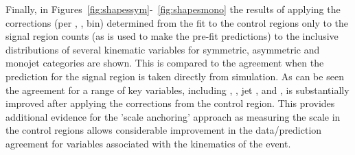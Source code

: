 Finally, in Figures~\ref{fig:shapessym}-~\ref{fig:shapesmono} the results of applying the corrections 
(per \scalht, \njet, \nb bin) determined from the fit to the
control regions only to the signal region counts (as is used to make the pre-fit predictions) 
to the inclusive distributions of several kinematic variables for symmetric, asymmetric and monojet 
categories are shown. This is compared to the agreement when the prediction for the signal region
is taken directly from simulation. As can be seen the agreement for a range of key variables,
including \scalht, \mht, jet \pt, \njet and \nb, is substantially improved after applying 
the corrections from the control region. This provides additional evidence for the 'scale anchoring'
approach as measuring the scale in the control regions allows considerable improvement
in the data/prediction agreement for variables associated with the kinematics of the event.

